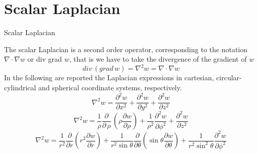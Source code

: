 \documentclass[handout,10pt]{beamer}
\begin{document}
\section{Scalar Laplacian}
\begin{frame}[shrink=00]{Scalar Laplacian}

The scalar Laplacian is a second order operator, corresponding to the notation $\nabla \cdot \nabla w$  or div grad $w$, that is we have to take the divergence of the gradient of $w$ 
%
\begin{equation}
div \,(grad \, w) = \nabla^2 w = \nabla \cdot \nabla w
 \label{Laplacian}
\end{equation}
%
\pause
In the following are reported the Laplacian expressions in cartesian, circular-cylindrical and spherical coordinate systems, respectively.
%
\begin{equation}
 \nabla^2 w =  \frac{\partial^2 w}{\partial x^2} +  \frac{\partial^2 w}{\partial y^2} +  \frac{\partial^2 w}{\partial z^2} 
 \label{Laplacianr}
\end{equation}
%
\pause
%
\begin{equation}
 \nabla^2 w =  \frac{1}{\rho} \frac{\partial }{\partial\,\rho}\,\left( \rho \frac{\partial w}{\partial \rho} \right) + 
 \frac{1}{\rho^2} \frac{\partial^2 w}{\partial \phi^2} +  \frac{\partial^2 w}{\partial z^2} 
 \label{Laplacianc}
\end{equation}
%
\pause
%
\begin{equation}
  \nabla^2 w  = \frac{1}{r^2}\frac{\partial}{\partial r}\left(r^2  \frac{\partial w}{\partial r}\right)  +   
 \frac{1}{r^2 \sin \theta}   \frac{\partial}{\partial \theta}  \left(  \sin \theta\frac{\partial w}{\partial \theta} \right) 
+  \frac{1}{r^2 \sin^2 \theta}\frac{\partial^2 w}{\partial \phi^2}  
  \label{Laplacians}
\end{equation}
%


\end{frame}
\end{document}
